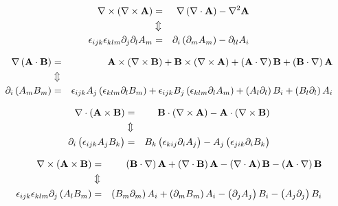 \begin{eqnarray}
\nabla\times\left(\nabla\times\mathbf{ A}\right) & = & 
\nabla\left(\nabla\cdot\mathbf{ A}\right)-\nabla^{2}\mathbf{ A}\nonumber \\
 & \Updownarrow\\
\epsilon_{ijk}\epsilon_{klm}\partial_{j}\partial_{l}A_{m} & = & 
\partial_{i}\left(\partial_{m}A_{m}\right)-\partial_{ll}A_{i}\nonumber
\end{eqnarray}



\begin{eqnarray}
\nabla\left(\mathbf{ A}\cdot\mathbf{ B}\right) & = & 
\mathbf{ A}\times\left(\nabla\times\mathbf{ B}\right)+\mathbf{ B}
\times\left(\nabla\times\mathbf{ A}\right)+\left(\mathbf{ A}
\cdot\nabla\right)\mathbf{ B}+\left(\mathbf{ B}\cdot\nabla\right)\mathbf{ A}
\nonumber \\
 & \Updownarrow\\
\partial_{i}\left(A_{m}B_{m}\right) & = & 
\epsilon_{ijk}A_{j}\left(\epsilon_{klm}\partial_{l}B_{m}\right)+\epsilon_{ijk}B_
{j}\left(\epsilon_{klm}\partial_{l}A_{m}\right)+\left(A_{l}\partial_{l}\right)B_
{i}+\left(B_{l}\partial_{l}\right)A_{i}\nonumber
\end{eqnarray}



\begin{eqnarray}
\nabla\cdot\left(\mathbf{ A}\times\mathbf{ B}\right) & = & 
\mathbf{ B}\cdot\left(\nabla\times\mathbf{ A}\right)-\mathbf{ A}
\cdot\left(\nabla\times\mathbf{ B}\right)\nonumber \\
 & \Updownarrow\\
\partial_{i}\left(\epsilon_{ijk}A_{j}B_{k}\right) & = & 
B_{k}\left(\epsilon_{kij}\partial_{i}A_{j}\right)-A_{j}\left(\epsilon_{jik}
\partial_{i}B_{k}\right)\nonumber
\end{eqnarray}



\begin{eqnarray}
\nabla\times\left(\mathbf{ A}\times\mathbf{ B}\right) & = & 
\left(\mathbf{ B}\cdot\nabla\right)\mathbf{ A}+\left(\nabla\cdot\mathbf{ B}
\right)\mathbf{ A}-\left(\nabla\cdot\mathbf{ A}\right)\mathbf{ B}-\left(\mathbf{ A}
\cdot\nabla\right)\mathbf{ B}\nonumber \\
 & \Updownarrow\\
\epsilon_{ijk}\epsilon_{klm}\partial_{j}\left(A_{l}B_{m}\right) & = & 
\left(B_{m}\partial_{m}\right)A_{i}+\left(\partial_{m}B_{m}\right)A_{i}
-\left(\partial_{j}A_{j}\right)B_{i}-\left(A_{j}\partial_{j}\right)B_{i}
\nonumber
\end{eqnarray}



